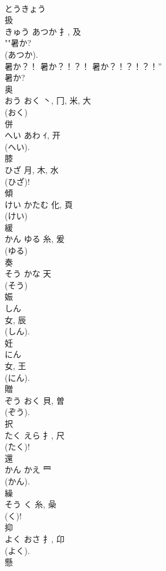 \documentclass[8pt]{extreport}
\begin{document}
\begin{CJK}{UTF8}{min}
\\	とうきょう 
\\	扱	
\\	きゅう	あつか	扌, 及	
\\	""暑か?
\\	(あつか). 
\\	暑か？！ 暑か？！？！ 暑か？！？！？！” 
\\	暑か? 
\\	奥	
\\	おう	おく	丶, 冂, 米, 大	
\\	(おく) 
\\	併	
\\	へい	あわ	ｲ, 开		
\\	(へい). 
\\	膝	
\\	ひざ	月, 木, 水		
\\	(ひざ)! 
\\	傾	
\\	けい	かたむ	化, 頁	
\\	(けい) 
\\	緩	
\\	かん	ゆる	糸, 爰	
\\	(ゆる) 
\\	奏	
\\	そう	かな	天		
\\	(そう) 
\\	娠	
\\	しん	
\\	女, 辰	
\\	(しん). 
\\	妊	
\\	にん	
\\	女, 王	
\\	(にん). 
\\	贈	
\\	ぞう	おく	貝, 曽	
\\	(ぞう). 
\\	択	
\\	たく	えら	扌, 尺	
\\	(たく)!	
\\	還	
\\	かん	かえ	罒	
\\	(かん). 
\\	繰	
\\	そう	く	糸, 喿	
\\	(く)! 
\\	抑	
\\	よく	おさ	扌, 卬	
\\	(よく). 
\\	懸	

\end{CJK}
\end{document}
